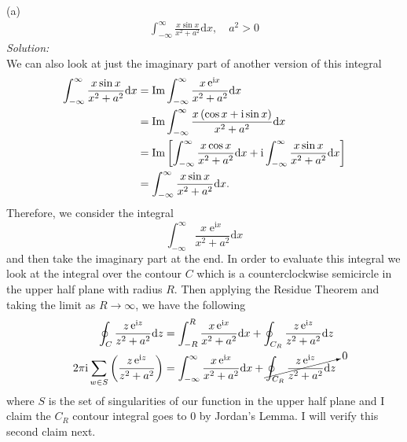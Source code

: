 \documentclass[10pt]{amsart}
\newcommand{\D}{\mathrm{d}}
\newcommand{\I}{\mathrm{i}}
\DeclareMathOperator{\E}{e}
\theoremstyle{nonumberplain}
\begin{document}
\begin{enumerate}[label={\bf {\arabic*}:}]
\noindent
(a) \\
\begin{align*}
\int_{-\infty}^{\infty} \frac {x \sin x}{x^2 + a^2 } \D x, \quad a^2 > 0
\end{align*}
\textit{Solution:} \\
We can also look at just the imaginary part of another version of this integral
\begin{align*}
\int_{-\infty}^{\infty} \frac {x \sin x}{x^2 + a^2 } \D x
	&= { \rm Im } \int_{-\infty}^{\infty} \frac {x \E^{\I x}}{x^2 + a^2 } \D x \\
	&= { \rm Im } \int_{-\infty}^{\infty} \frac {x \left( \cos x + \I \sin x \right)}{x^2 + a^2 } \D x \\
	&= { \rm Im } \left[
		\int_{-\infty}^{\infty} \frac {x \cos x }{x^2 + a^2 } \D x
		+ \I \int_{-\infty}^{\infty} \frac {x \sin x }{x^2 + a^2 } \D x
	\right] \\
	&= \int_{-\infty}^{\infty} \frac {x \sin x}{x^2 + a^2 } \D x.
\end{align*}
Therefore, we consider the integral 
$$
\int_{-\infty}^{\infty} \frac {x \E^{\I x}}{x^2 + a^2 } \D x
$$
and then take the imaginary part at the end.
In order to evaluate this integral we look at the integral over the contour $C$ which is a counterclockwise semicircle in the upper half plane with radius $R$.
Then applying the Residue Theorem and taking the limit as $R \rightarrow \infty$, we have the following
\begin{align*}
\oint_{C} \frac {z \E^{\I z}}{z^2 + a^2 } \D z
	&= \int_{-R}^{R} \frac {x \E^{\I x}}{x^2 + a^2 } \D x + \oint_{C_R} \frac {z \E^{\I z}}{z^2 + a^2 } \D z \\
2 \pi \I\sum_{w \in S} \left( \frac {z \E^{\I z}}{z^2 + a^2 } \right)
	&= \int_{-\infty}^{\infty} \frac {x \E^{\I x}}{x^2 + a^2 } \D x + \cancelto{0}{\oint_{C_R} \frac {z \E^{\I z}}{z^2 + a^2 } \D z}
\end{align*}
where $S$ is the set of singularities of our function in the upper half plane and I claim the $C_R$ contour integral goes to 0 by Jordan's Lemma.
I will verify this second claim next.\\


\end{enumerate}
\end{document}
